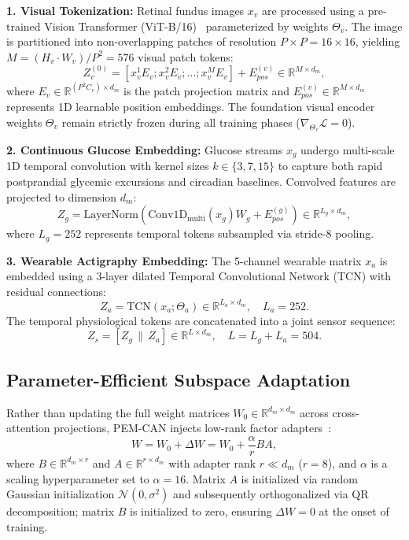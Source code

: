 \documentclass[a4paper,fleqn]{cas-dc}
\begin{document}
\textbf{1. Visual Tokenization:} Retinal fundus images $x_v$ are processed using a pre-trained Vision Transformer (ViT-B/16)~\cite{zhou2023retfound} parameterized by weights $\Theta_v$. The image is partitioned into non-overlapping patches of resolution $P \times P = 16 \times 16$, yielding $M = (H_v \cdot W_v)/P^2 = 576$ visual patch tokens:
\begin{equation}
    Z_v^{(0)} = [x_v^1 E_v; x_v^2 E_v; \dots; x_v^M E_v] + E_{pos}^{(v)} \in \mathbb{R}^{M \times d_m},
\end{equation}
where $E_v \in \mathbb{R}^{(P^2 C_v) \times d_m}$ is the patch projection matrix and $E_{pos}^{(v)} \in \mathbb{R}^{M \times d_m}$ represents 1D learnable position embeddings. The foundation visual encoder weights $\Theta_v$ remain strictly frozen during all training phases ($\nabla_{\Theta_v} \mathcal{L} = 0$).

\textbf{2. Continuous Glucose Embedding:} Glucose streams $x_g$ undergo multi-scale 1D temporal convolution with kernel sizes $k \in \{3, 7, 15\}$ to capture both rapid postprandial glycemic excursions and circadian baselines. Convolved features are projected to dimension $d_m$:
\begin{equation}
    Z_g = \text{LayerNorm}(\text{Conv1D}_{\text{multi}}(x_g) W_g + E_{pos}^{(g)}) \in \mathbb{R}^{L_g \times d_m},
\end{equation}
where $L_g = 252$ represents temporal tokens subsampled via stride-8 pooling.

\textbf{3. Wearable Actigraphy Embedding:} The 5-channel wearable matrix $x_a$ is embedded using a 3-layer dilated Temporal Convolutional Network (TCN) with residual connections:
\begin{equation}
    Z_a = \text{TCN}(x_a; \Theta_a) \in \mathbb{R}^{L_a \times d_m}, \quad L_a = 252.
\end{equation}
The temporal physiological tokens are concatenated into a joint sensor sequence:
\begin{equation}
    Z_s = [Z_g \,\|\, Z_a] \in \mathbb{R}^{L \times d_m}, \quad L = L_g + L_a = 504.
\end{equation}

\subsection{Parameter-Efficient Subspace Adaptation}
\label{sec:peft_subspace}
Rather than updating the full weight matrices $W_0 \in \mathbb{R}^{d_m \times d_m}$ across cross-attention projections, PEM-CAN injects low-rank factor adapters~\cite{hu2022lora}:
\begin{equation}
    W = W_0 + \Delta W = W_0 + \frac{\alpha}{r} B A,
    \label{eq:lora_decomp}
\end{equation}
where $B \in \mathbb{R}^{d_m \times r}$ and $A \in \mathbb{R}^{r \times d_m}$ with adapter rank $r \ll d_m$ ($r=8$), and $\alpha$ is a scaling hyperparameter set to $\alpha = 16$. Matrix $A$ is initialized via random Gaussian initialization $\mathcal{N}(0, \sigma^2)$ and subsequently orthogonalized via QR decomposition; matrix $B$ is initialized to zero, ensuring $\Delta W = 0$ at the onset of training.
\end{document}
